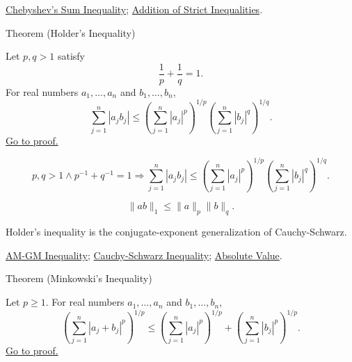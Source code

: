 \begin{dependencies}
\hyperref[thm:ineq-chebyshev-sum]{Chebyshev's Sum Inequality};
\hyperref[thm:ineq-add-inequalities]{Addition of Strict Inequalities}.
\end{dependencies}

\begin{theorembox}{Theorem (Holder's Inequality)}
\begin{theorem}
\label{thm:ineq-holder}
Let $p,q>1$ satisfy
\[
\frac1p+\frac1q=1.
\]
For real numbers $a_1,\dots,a_n$ and $b_1,\dots,b_n$,
\[
\sum_{j=1}^{n}|a_jb_j|
\le
\left(\sum_{j=1}^{n}|a_j|^p\right)^{1/p}
\left(\sum_{j=1}^{n}|b_j|^q\right)^{1/q}.
\]
\hyperref[prf:ineq-holder]{Go to proof.}
\end{theorem}
\end{theorembox}

\begin{remark*}
\[
p,q>1\land p^{-1}+q^{-1}=1
\Rightarrow
\sum_{j=1}^{n}|a_jb_j|
\le
\left(\sum_{j=1}^{n}|a_j|^p\right)^{1/p}
\left(\sum_{j=1}^{n}|b_j|^q\right)^{1/q}.
\]
\end{remark*}

\begin{remark*}
\[
\|ab\|_1\le \|a\|_p\|b\|_q.
\]
\end{remark*}

\begin{remark*}[Interpretation]
Holder's inequality is the conjugate-exponent generalization of
Cauchy-Schwarz.
\end{remark*}

\begin{dependencies}
\hyperref[thm:ineq-am-gm]{AM-GM Inequality};
\hyperref[thm:ineq-cauchy-schwarz]{Cauchy-Schwarz Inequality};
\hyperref[def:absolute-value]{Absolute Value}.
\end{dependencies}

\begin{theorembox}{Theorem (Minkowski's Inequality)}
\begin{theorem}
\label{thm:ineq-minkowski}
Let $p\ge1$. For real numbers $a_1,\dots,a_n$ and $b_1,\dots,b_n$,
\[
\left(\sum_{j=1}^{n}|a_j+b_j|^p\right)^{1/p}
\le
\left(\sum_{j=1}^{n}|a_j|^p\right)^{1/p}
+
\left(\sum_{j=1}^{n}|b_j|^p\right)^{1/p}.
\]
\hyperref[prf:ineq-minkowski]{Go to proof.}
\end{theorem}
\end{theorembox}

